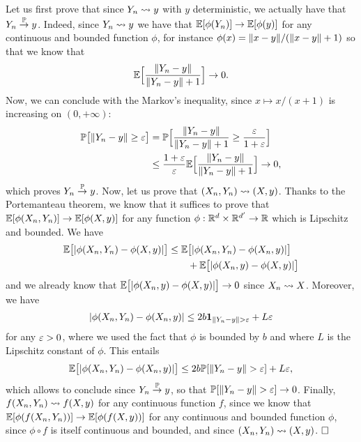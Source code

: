 Let us first prove that since $Y_n \leadsto y$ with $y$ deterministic, we actually have that $Y_n \overset{\mathbb P}{\rightarrow} y$.
Indeed, since $Y_n \leadsto y$ we have that $\mathbb E [\phi(Y_n)] \rightarrow \mathbb E [\phi(y)]$ for any continuous and bounded function $\phi$, for instance $\phi(x) = \| x - y \| / (\| x - y \| + 1)$ so that we know that
\begin{equation*}
	\mathbb E \Big[ \frac{\| Y_n - y \|}{\| Y_n - y \| + 1} \Big] \rightarrow 0.
\end{equation*}
Now, we can conclude with the Markov's inequality, since $x \mapsto x / (x + 1)$ is increasing on $(0, +\infty)$:
\begin{align*}
	\mathbb P\big[ \| Y_n - y \| \geq \varepsilon\big] &= \mathbb P\Big[ \frac{\| Y_n - y \|}{\| Y_n - y \| + 1} 
	\geq \frac{\varepsilon}{1 + \varepsilon} \Big] \\
	&\leq \frac{1 + \varepsilon}{\varepsilon} \mathbb E \Big[ \frac{\| Y_n - y \|}{\| Y_n - y \| + 1} \Big] \rightarrow 0,
\end{align*}
which proves $Y_n \overset{\mathbb P}{\rightarrow} y$.
Now, let us prove that $(X_n, Y_n) \leadsto (X, y)$. Thanks to the Portemanteau theorem, we know that it suffices to prove that $\mathbb E[\phi(X_n, Y_n)] \rightarrow \mathbb E[\phi(X, y)]$ for any function $\phi : \mathbb R^d \times \mathbb R^{d'} \rightarrow \mathbb R$ which is Lipschitz and bounded.
We have
\begin{align*}
	\mathbb E\big[ | \phi(X_n, Y_n) - \phi(X, y) | \big] &\leq \mathbb E\big[ | \phi(X_n, Y_n) - \phi(X_n, y) | \big] \\
	& \quad \quad + \mathbb E\big[ | \phi(X_n, y) - \phi(X, y) | \big] 
\end{align*}
and we already know that $\mathbb E\big[ | \phi(X_n, y) - \phi(X, y) | \big] \rightarrow 0$ since $X_n \leadsto X$.
Moreover, we have 
\begin{align*}
	| \phi(X_n, Y_n) - \phi(X_n, y) | \leq 2 b\mathbf 1_{\| Y_n - y \| > \varepsilon} + L \varepsilon
\end{align*}
for any $\varepsilon > 0$, where we used the fact that $\phi$ is bounded by $b$ and where $L$ is the Lipschitz constant of $\phi$.
This entails
\begin{equation*}
	\mathbb E \big[ | \phi(X_n, Y_n) - \phi(X_n, y) | \big] \leq 2 b \mathbb P[\| Y_n - y \| > \varepsilon] + L \varepsilon,
\end{equation*}
which allows to conclude since $Y_n \overset{\mathbb P}{\rightarrow} y$, so that $\mathbb P[\| Y_n - y \| > \varepsilon] \rightarrow 0$.
Finally, $f(X_n, Y_n) \leadsto f(X, y)$ for any continuous function $f$, since we know that $\mathbb E[\phi(f(X_n, Y_n))] \rightarrow \mathbb E[\phi(f(X, y))]$ for any continuous and bounded function $\phi$, since $\phi \circ f$ is itself continuous and bounded, and since $(X_n, Y_n) \leadsto (X, y)$. $\hfill \square$


